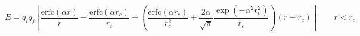 \documentclass[12pt]{article}
\begin{document}
$$
  E = 
  q_iq_j \left[ \frac{\mbox{erfc} (\alpha r)}{r} -  \frac{\mbox{erfc} (\alpha r_c)}{r_c} + 
  \left( \frac{\mbox{erfc} (\alpha r_c)}{r_c^2} +  \frac{2\alpha}{\sqrt{\pi}}\frac{\exp (-\alpha^2    r^2_c)}{r_c} \right)(r-r_c) \right] \qquad r < r_c 
$$
\end{document}
